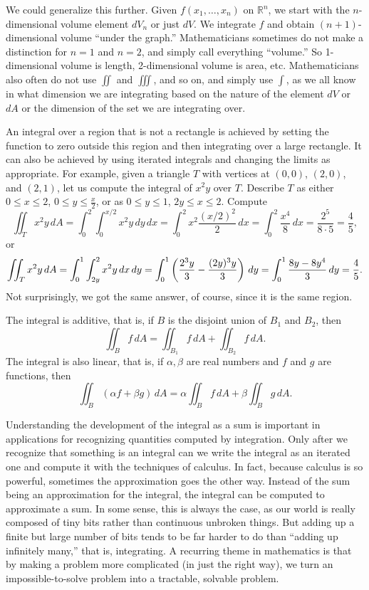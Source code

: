 \documentclass[12pt]{article}
\newcommand{\R}{{\mathbb{R}}}
\newcommand{\avoidbreak}{\postdisplaypenalty=100}
\begin{document}
We could generalize this further. Given $f(x_1,\ldots,x_n)$ on $\R^n$, we start with
the $n$-dimensional volume element $dV_n$ or just $dV$.
We integrate $f$ and obtain
$(n+1)$-dimensional volume ``under the graph.''
Mathematicians sometimes do not make a distinction for $n=1$ and $n=2$, and simply call
everything ``volume.''
So 1-dimensional volume is length, 2-dimensional volume is
area, etc.
Mathematicians also often do not use $\iint$ and $\iiint$,
and so on, and simply use $\int$,
as we all know in what dimension we are integrating based on the nature of
the element $dV$ or $dA$ or the dimension of the
set we are integrating over.

An integral over a region that is not a rectangle
is achieved by setting the function to zero
outside this region and then integrating over
a large rectangle.  It can also be achieved by
using iterated integrals and
changing the limits as appropriate.  For example,
given a triangle $T$ with vertices at $(0,0)$, $(2,0)$,
and $(2,1)$, let us compute the integral of $x^2y$
over $T$.  Describe $T$ as either
$0 \leq x \leq 2$, $0 \leq y \leq \frac{x}{2}$, or as
$0 \leq y \leq 1$, $2y \leq x \leq 2$.  Compute
\[
\iint_T x^2 y \, dA
=
\int_0^2 \int_0^{x/2} x^2y \, dy \, dx
=
\int_0^2 x^2\frac{(x/2)^2}{2}  \, dx
=
\int_0^2 \frac{x^4}{8}  \, dx
=
 \frac{2^5}{8 \cdot 5} = \frac{4}{5} ,
\]
or
\[
\iint_T x^2 y \, dA
=
\int_0^1 \int_{2y}^{2} x^2y \, dx \, dy
=
\int_0^1 \left(\frac{2^3 y}{3} - \frac{(2y)^3y}{3} \right) \, dy
=
\int_0^1 \frac{8y-8y^4}{3} \, dy
=
\frac{4}{5} .
\avoidbreak
\]
Not surprisingly, we got the same answer, of course, since it is the same region.

The integral is additive, that is, if $B$ is the disjoint union of $B_1$ and $B_2$,
then
\[
\iint_B f \, dA = 
\iint_{B_1} f \, dA +
\iint_{B_2} f \, dA .
\]
The integral is also linear, that is, if $\alpha, \beta$ are real numbers and
$f$ and $g$ are functions, then
\[
\iint_B (\alpha f + \beta g) \, dA = 
\alpha \iint_B f \, dA +
\beta \iint_B g \, dA .
\]

Understanding the development of the integral as a sum is important
in applications for recognizing quantities computed by integration.
Only after we recognize that something is an integral can we write the integral as an iterated
one and compute it with the techniques of calculus.
In fact, because calculus is
so powerful, sometimes the approximation goes the other way.
Instead of the sum being an approximation for the integral, the integral can be
computed to approximate a sum.
In some sense, this is always the case, as our world is
really composed of tiny bits rather than continuous unbroken things.
But adding up a finite but large number of bits tends to be far harder to do than
``adding up infinitely many,'' that is, integrating.
A recurring theme in mathematics is that by making a problem more complicated
(in just the right way), we turn an impossible-to-solve problem
into a tractable, solvable problem.
\end{document}
